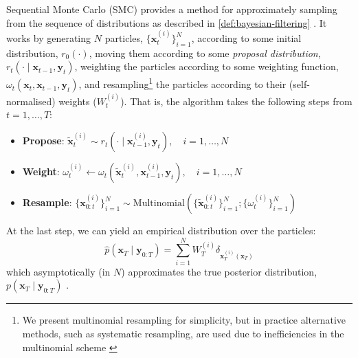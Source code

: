\begin{definition} \label{def:smc}
    Sequential Monte Carlo (SMC) provides a method for approximately sampling from the sequence of
    distributions as described in \ref{def:bayesian-filtering}
    \parencite{chopinIntroductionSequentialMonte2020}. It works by generating $N$ particles,
    $\{\mathbf{x}_t^{(i)}\}_{i=1}^N$, according to some initial distribution, $r_0(\cdot)$,
    moving them according to some \emph{proposal distribution},
    $r_t(\cdot \mid \mathbf{x}_{t-1}, \mathbf{y}_{t})$, weighting the particles according to
    some weighting function, $\omega_t(\mathbf{x}_t, \mathbf{x}_{t-1}, \mathbf{y}_t)$, and
    resampling\footnote{We present multinomial resampling for simplicity, but in practice
    alternative methods, such as systematic resampling, are used due to inefficiencies in the
    multinomial scheme \parencite{chopinIntroductionSequentialMonte2020}} the particles according to
    their (self-normalised) weights ($W_t^{(i)}$). That is, the algorithm takes the following steps
    from $t=1,\ldots,T$:
    \begin{itemize}
        \item \textbf{Propose}: $\tilde{\mathbf{x}}_t^{(i)} \sim r_t(\cdot \mid \mathbf{x}_{t-1}^{(i)}, \mathbf{y}_t), \quad i = 1,\ldots,N$
        \item \textbf{Weight}: $\omega_t^{(i)} \leftarrow \omega_t(\tilde{\mathbf{x}}_t^{(i)}, \mathbf{x}_{t-1}^{(i)}, \mathbf{y}_t), \quad i = 1,\ldots,N$
        \item \textbf{Resample}: $\{\mathbf{x}_{0:t}^{(i)}\}_{i=1}^N \sim \text{Multinomial}\left(\{\tilde{\mathbf{x}}_{0:t}^{(i)}\}_{i=1}^N; \{\omega_t^{(i)}\}_{i=1}^N\right)$
    \end{itemize}
    At the last step, we can yield an empirical distribution over the particles:
    \begin{equation*}
        \hat{p}(\mathbf{x}_T \mid \mathbf{y}_{0:T}) = \sum_{i=1}^N W_{T}^{(i)}\delta_{\mathbf{x}_{T}^{(i)}(\mathbf{x}_T)}
    \end{equation*}
    which asymptotically (in $N$) approximates the true posterior distribution,
    $p(\mathbf{x}_T \mid \mathbf{y}_{0:T})$ \parencite{delmoralCentralLimitTheorems2011,chopinIntroductionSequentialMonte2020}.
\end{definition}

